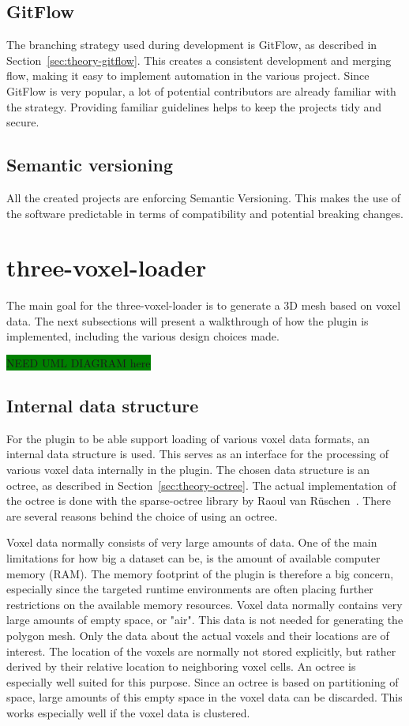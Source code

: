 \subsection{GitFlow}
The branching strategy used during development is GitFlow, as described in Section~\ref{sec:theory-gitflow}. This creates a consistent development and merging flow, making it easy to implement automation in the various project. Since GitFlow is very popular, a lot of potential contributors are already familiar with the strategy. Providing familiar guidelines helps to keep the projects tidy and secure.

\subsection{Semantic versioning}
All the created projects are enforcing Semantic Versioning. This makes the use of the software predictable in terms of compatibility and potential breaking changes.

\section{three-voxel-loader}
The main goal for the three-voxel-loader is to generate a 3D mesh based on voxel data. The next subsections will present a walkthrough of how the plugin is implemented, including the various design choices made.

\colorbox{green}{NEED UML DIAGRAM here}\\

\subsection{Internal data structure}
For the plugin to be able support loading of various voxel data formats, an internal data structure is used. This serves as an interface for the processing of various voxel data internally in the plugin. The chosen data structure is an octree, as described in Section~\ref{sec:theory-octree}. The actual implementation of the octree is done with the sparse-octree library by Raoul van R\"uschen~\cite{sparse-octree}. There are several reasons behind the choice of using an octree. 

Voxel data normally consists of very large amounts of data. One of the main limitations for how big a dataset can be, is the amount of available computer memory (RAM). The memory footprint of the plugin is therefore a big concern, especially since the targeted runtime environments are often placing further restrictions on the available memory resources. Voxel data normally contains very large amounts of empty space, or "air". This data is not needed for generating the polygon mesh. Only the data about the actual voxels and their locations are of interest. The location of the voxels are normally not stored explicitly, but rather derived by their relative location to neighboring voxel cells. An octree is especially well suited for this purpose. Since an octree is based on partitioning of space, large amounts of this empty space in the voxel data can be discarded. This works especially well if the voxel data is clustered.

